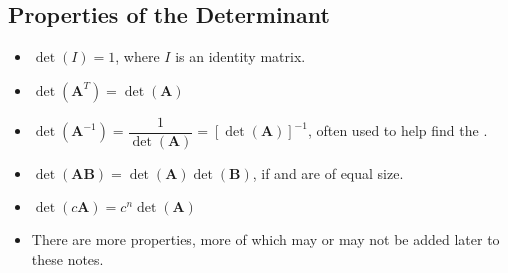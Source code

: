 \begin{itemize}
  \subsection{Properties of the Determinant}\label{Properties of the Determinant}
  \begin{itemize}
    \item \(\det(I)=1\), where \(I\) is an identity matrix.
    \item \(\det(\bm{A}^T) = \det(\bm{A})\) 
    \item \(\det(\bm{A}^{-1}) = \dfrac{1}{\det(\bm{A})}= [\det(\bm{A})]^{-1} \), often used to help find the \hyperref[Matrix Inverse]{}. %
    \item \(\det(\bm{AB})=\det(\bm{A})\det(\bm{B}) \), if  and  are of equal size.
    \item \(\det(c \bm{A}) = c^n \det(\bm{A})\)
    \item There are more properties, more of which may or may not be added later to these notes.
  \end{itemize}
  
\end{itemize}
